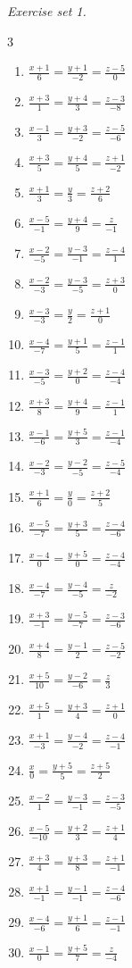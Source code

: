 \par\noindent\emph{Exercise set 1.}\nopagebreak
\begin{multicols}{3}\raggedright
\begin{enumerate}[label=\arabic*., leftmargin=*, itemsep=1pt]
\item $\frac{x+1}{6}=\frac{y+1}{-2}=\frac{z-5}{0}$
\item $\frac{x+3}{1}=\frac{y+4}{3}=\frac{z-3}{-8}$
\item $\frac{x-1}{3}=\frac{y+3}{-2}=\frac{z-5}{-6}$
\item $\frac{x+3}{5}=\frac{y+4}{5}=\frac{z+1}{-2}$
\item $\frac{x+1}{3}=\frac{y}{3}=\frac{z+2}{6}$
\item $\frac{x-5}{-1}=\frac{y+4}{9}=\frac{z}{-1}$
\item $\frac{x-2}{-5}=\frac{y-3}{-1}=\frac{z-4}{1}$
\item $\frac{x-2}{-3}=\frac{y-3}{-5}=\frac{z+3}{0}$
\item $\frac{x-3}{-3}=\frac{y}{2}=\frac{z+1}{0}$
\item $\frac{x-4}{-7}=\frac{y+1}{5}=\frac{z-1}{1}$
\item $\frac{x-3}{-5}=\frac{y+2}{0}=\frac{z-4}{-4}$
\item $\frac{x+3}{8}=\frac{y+4}{9}=\frac{z-1}{1}$
\item $\frac{x-1}{-6}=\frac{y+5}{3}=\frac{z-1}{-4}$
\item $\frac{x-2}{-3}=\frac{y-2}{-5}=\frac{z-5}{-4}$
\item $\frac{x+1}{6}=\frac{y}{0}=\frac{z+2}{5}$
\item $\frac{x-5}{-7}=\frac{y+3}{5}=\frac{z-4}{-6}$
\item $\frac{x-4}{0}=\frac{y+5}{0}=\frac{z-4}{-4}$
\item $\frac{x-4}{-7}=\frac{y-4}{-5}=\frac{z}{-2}$
\item $\frac{x+3}{-1}=\frac{y-5}{-7}=\frac{z-3}{-6}$
\item $\frac{x+4}{8}=\frac{y-1}{2}=\frac{z-5}{-2}$
\item $\frac{x+5}{10}=\frac{y-2}{-6}=\frac{z}{3}$
\item $\frac{x+5}{1}=\frac{y+3}{4}=\frac{z+1}{0}$
\item $\frac{x+1}{-3}=\frac{y-4}{-2}=\frac{z-4}{-1}$
\item $\frac{x}{0}=\frac{y+5}{5}=\frac{z+5}{2}$
\item $\frac{x-2}{1}=\frac{y-3}{-1}=\frac{z-3}{-5}$
\item $\frac{x-5}{-10}=\frac{y+2}{3}=\frac{z+1}{4}$
\item $\frac{x+3}{4}=\frac{y+3}{8}=\frac{z+1}{-1}$
\item $\frac{x+1}{-1}=\frac{y-1}{-1}=\frac{z-4}{-6}$
\item $\frac{x-4}{-6}=\frac{y+1}{6}=\frac{z-1}{-1}$
\item $\frac{x-1}{0}=\frac{y+5}{7}=\frac{z}{-4}$
\end{enumerate}
\end{multicols}
